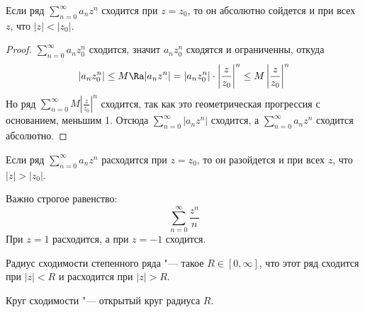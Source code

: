 \begin{theorem}[Абеля]
	Если ряд $\sum_{n=0}^\infty a_n z^n$ сходится при $z = z_0$, то он абсолютно сойдется и при всех $z$, что $|z| < |z_0|$.
\end{theorem}
\begin{proof}
	$\sum_{n=0}^\infty a_n z_0^n$ сходится, значит $a_n z_0^n$ сходятся и ограниченны, откуда
	\begin{gather*}
		|a_n z_0^n| \le M
		\Ra |a_n z^n| = |a_n z_0^n| \cdot \left| \frac{z}{z_0} \right|^n \le M \left| \frac{z}{z_0} \right|^n
	\end{gather*}
	Но ряд $\sum_{n=0}^\infty M \left| \frac{z}{z_0} \right|^n$ сходится, так как это геометрическая прогрессия с основанием, меньшим 1.
	Отсюда $\sum_{n=0}^\infty |a_n z^n|$ сходится, а $\sum_{n=0}^\infty a_n z^n$ сходится абсолютно.
\end{proof}

\begin{conseq}
	Если ряд $\sum_{n=0}^\infty a_n z^n$ расходится при $z = z_0$, то он разойдется и при всех $z$, что $|z| > |z_0|$.
\end{conseq}

\begin{exmp}
	Важно строгое равенство:
	\[ \sum_{n=0}^\infty \frac{z^n}n \]
	При $z = 1$ расходится, а при $z = -1$ сходится.
\end{exmp}

\begin{Def}
	Радиус сходимости степенного ряда "--- такое $R \in [0, \infty]$, что этот ряд сходится при $|z| < R$ и расходится при $|z| > R$.
\end{Def}

\begin{Def}
	Круг сходимости "--- открытый круг радиуса $R$.
\end{Def}

